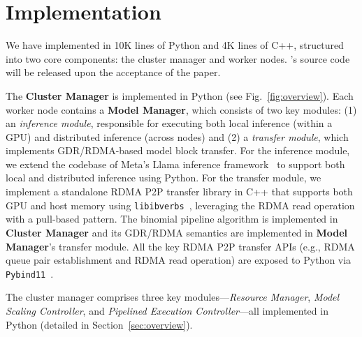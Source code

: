 \section{\SysName Implementation}
\label{sec:implementation}
We have implemented \SysName in 10K lines of Python and 4K lines of C++, structured into two core components: the cluster manager and worker nodes. \SysName's source code will be released upon the acceptance of the paper.  

The {\bf Cluster Manager} is implemented in Python (see Fig.~\ref{fig:overview}). 
Each worker node contains a {\bf Model Manager}, which consists of two key modules: (1) an \emph{inference module},  responsible for executing both local inference (within a GPU) and distributed inference (across nodes) and (2) a \emph{transfer module}, which implements GDR/RDMA-based model block transfer. For the inference module, we extend the codebase of Meta's Llama inference framework~\cite{metainf} to support both local and distributed inference using Python. For the transfer module, we implement a standalone RDMA P2P transfer library in C++ that supports both GPU and host memory using {\small\texttt{libibverbs}}~\cite{ibverbs}, leveraging the RDMA read operation with a pull-based pattern. The binomial pipeline algorithm is implemented in {\bf Cluster Manager} and its GDR/RDMA semantics are implemented in {\bf Model Manager}'s transfer module. 
All the key RDMA P2P transfer APIs (e.g., RDMA queue pair establishment and RDMA read operation) are exposed to Python via {\small\texttt{Pybind11}}~\cite{pybind11}. 

The cluster manager comprises three key modules—\textit{Resource Manager}, \textit{Model Scaling Controller}, and \textit{Pipelined Execution Controller}—all implemented in Python 
(detailed in Section~\ref{sec:overview}). 
\fi 


